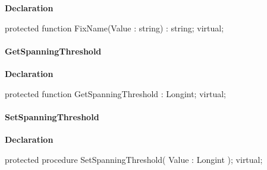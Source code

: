\documentclass{report}
\newif\ifpdf
\begin{document}
\label{AbArcTyp.TAbArchive-FixName}
\begin{list}{}{
\setlength{\itemindent}{0cm}
\setlength{\listparindent}{0cm}
\setlength{\leftmargin}{\evensidemargin}
\addtolength{\leftmargin}{\tmplength}
\settowidth{\labelsep}{X}
\addtolength{\leftmargin}{\labelsep}
\setlength{\labelwidth}{\tmplength}
}
\item[\textbf{Declaration}\hfill]
\ifpdf
\begin{flushleft}
\fi
\begin{ttfamily}
protected function FixName(Value : string) : string; virtual;\end{ttfamily}

\ifpdf
\end{flushleft}
\fi

\end{list}
\paragraph*{GetSpanningThreshold}\hspace*{\fill}

\label{AbArcTyp.TAbArchive-GetSpanningThreshold}
\begin{list}{}{
\setlength{\itemindent}{0cm}
\setlength{\listparindent}{0cm}
\setlength{\leftmargin}{\evensidemargin}
\addtolength{\leftmargin}{\tmplength}
\settowidth{\labelsep}{X}
\addtolength{\leftmargin}{\labelsep}
\setlength{\labelwidth}{\tmplength}
}
\item[\textbf{Declaration}\hfill]
\ifpdf
\begin{flushleft}
\fi
\begin{ttfamily}
protected function GetSpanningThreshold : Longint; virtual;\end{ttfamily}

\ifpdf
\end{flushleft}
\fi

\end{list}
\paragraph*{SetSpanningThreshold}\hspace*{\fill}

\label{AbArcTyp.TAbArchive-SetSpanningThreshold}
\begin{list}{}{
\setlength{\itemindent}{0cm}
\setlength{\listparindent}{0cm}
\setlength{\leftmargin}{\evensidemargin}
\addtolength{\leftmargin}{\tmplength}
\settowidth{\labelsep}{X}
\addtolength{\leftmargin}{\labelsep}
\setlength{\labelwidth}{\tmplength}
}
\item[\textbf{Declaration}\hfill]
\ifpdf
\begin{flushleft}
\fi
\begin{ttfamily}
protected procedure SetSpanningThreshold( Value : Longint ); virtual;\end{ttfamily}

\ifpdf
\end{flushleft}
\fi

\end{list}
\end{document}
